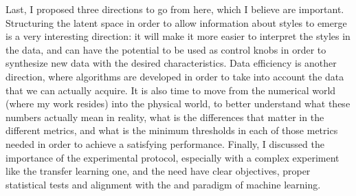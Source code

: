   \par Last, I proposed three directions to go from here, which I believe are important. Structuring the latent space in order to allow information about styles to emerge is a very interesting direction: it will make it more easier to interpret the styles in the data, and can have the potential to be used as control knobs in order to synthesize new data with the desired characteristics. Data efficiency is another direction, where algorithms are developed in order to take into account the data that we can actually acquire. It is also time to move from the numerical world (where my work resides) into the physical world, to better understand what these numbers actually mean in reality, what is the differences that matter in the different metrics, and what is the minimum thresholds in each of those metrics needed in order to achieve a satisfying performance. Finally, I discussed the importance of the experimental protocol, especially with a complex experiment like the transfer learning one, and the need have clear objectives, proper statistical tests and alignment with the and paradigm of machine learning.

